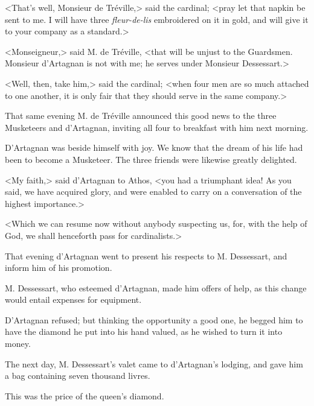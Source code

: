 <That's well, Monsieur de Tréville,> said the cardinal; <pray let that napkin be sent to me. I will have three \textit{fleur-de-lis} embroidered on it in gold, and will give it to your company as a standard.> 

<Monseigneur,> said M. de Tréville, <that will be unjust to the Guardsmen. Monsieur d'Artagnan is not with me; he serves under Monsieur Dessessart.> 

<Well, then, take him,> said the cardinal; <when four men are so much attached to one another, it is only fair that they should serve in the same company.> 

That same evening M. de Tréville announced this good news to the three Musketeers and d'Artagnan, inviting all four to breakfast with him next morning. 

D'Artagnan was beside himself with joy. We know that the dream of his life had been to become a Musketeer. The three friends were likewise greatly delighted. 

<My faith,> said d'Artagnan to Athos, <you had a triumphant idea! As you said, we have acquired glory, and were enabled to carry on a conversation of the highest importance.> 

<Which we can resume now without anybody suspecting us, for, with the help of God, we shall henceforth pass for cardinalists.> 

That evening d'Artagnan went to present his respects to M. Dessessart, and inform him of his promotion. 

M. Dessessart, who esteemed d'Artagnan, made him offers of help, as this change would entail expenses for equipment. 

D'Artagnan refused; but thinking the opportunity a good one, he begged him to have the diamond he put into his hand valued, as he wished to turn it into money. 

The next day, M. Dessessart's valet came to d'Artagnan's lodging, and gave him a bag containing seven thousand livres. 

This was the price of the queen's diamond.
